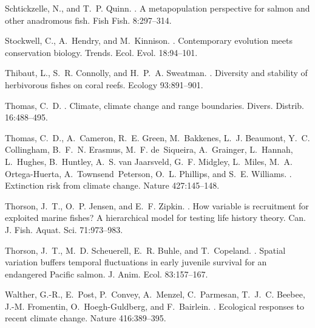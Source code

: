 \documentclass[12pt,english]{article}
\begin{document}
\begin{spacing}{1.9}
\begin{thebibliography}{64}
Schtickzelle, N., and T.~P. Quinn.
.
\newblock A metapopulation perspective for salmon and other anadromous fish.
\newblock Fish Fish. 8:297--314.

Stockwell, C., A.~Hendry, and M.~Kinnison.
.
\newblock Contemporary evolution meets conservation biology.
\newblock Trends. Ecol. Evol. 18:94--101.

Thibaut, L., S.~R. Connolly, and H.~P.~A. Sweatman.
.
\newblock Diversity and stability of herbivorous fishes on coral reefs.
\newblock Ecology 93:891--901.

Thomas, C.~D.
.
\newblock Climate, climate change and range boundaries.
\newblock Divers. Distrib. 16:488--495.

Thomas, C.~D., A.~Cameron, R.~E. Green, M.~Bakkenes, L.~J. Beaumont, Y.~C.
  Collingham, B.~F.~N. Erasmus, M.~F. de~Siqueira, A.~Grainger, L.~Hannah,
  L.~Hughes, B.~Huntley, A.~S. van Jaarsveld, G.~F. Midgley, L.~Miles, M.~A.
  Ortega-Huerta, A.~Townsend~Peterson, O.~L. Phillips, and S.~E. Williams.
.
\newblock Extinction risk from climate change.
\newblock Nature 427:145--148.

Thorson, J.~T., O.~P. Jensen, and E.~F. Zipkin.
.
\newblock How variable is recruitment for exploited marine fishes? A
  hierarchical model for testing life history theory.
\newblock Can. J. Fish. Aquat. Sci. 71:973--983.

Thorson, J.~T., M.~D. Scheuerell, E.~R. Buhle, and T.~Copeland.
.
\newblock Spatial variation buffers temporal fluctuations in early juvenile
  survival for an endangered {Pacific} salmon.
\newblock J. Anim. Ecol. 83:157--167.

Walther, G.-R., E.~Post, P.~Convey, A.~Menzel, C.~Parmesan, T.~J.~C. Beebee,
  J.-M. Fromentin, O.~Hoegh-Guldberg, and F.~Bairlein.
.
\newblock Ecological responses to recent climate change.
\newblock Nature 416:389--395.


\end{thebibliography}
\end{spacing}
\end{document}
